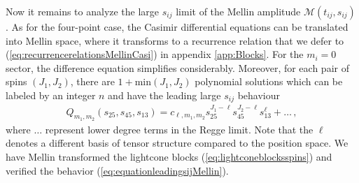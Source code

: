 Now it remains to analyze the large $s_{ij}$ limit of the Mellin amplitude $\mathcal{M}(t_{ij},s_{ij})$.
As for the four-point case, the Casimir differential equations can be translated into Mellin space, where it transforms to a recurrence relation
that we defer to (\ref{eq:recurrencerelationsMellinCasi}) in appendix \ref{app:Blocks}.
For the $m_i=0$ sector,  the difference equation simplifies considerably. Moreover, for each pair of spins $(J_1,J_2)$, there are $1+\textrm{min}(J_1,J_2)$ polynomial solutions which can be labeled by an integer $n$
and have the leading large $s_{ij}$ behaviour
\begin{align}
  Q_{m_1,m_2}(s_{25},s_{45},s_{13}) = c_{\ell,m_1,m_2}s_{25}^{J_1-\ell} s_{45}^{J_2-\ell}s_{13}^{\ell} +\dots \,,
  \label{eq:equationleadingsijMellin}
\end{align}
where $\dots$ represent lower degree terms in the Regge limit.
Note that the $\ell$ denotes a different basis of tensor structure compared to the position space.
 We have Mellin transformed the lightcone blocks (\ref{eq:lightconeblocksspins}) and verified the behavior  (\ref{eq:equationleadingsijMellin}).

